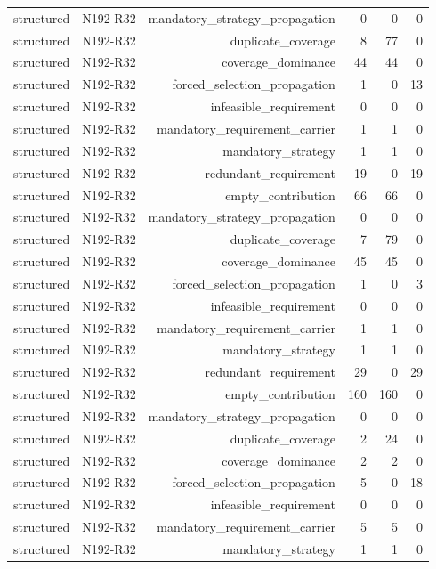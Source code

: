 {\begin{longtable}{lrrrrr}
structured & N192-R32 & mandatory\_strategy\_propagation & 0 & 0 & 0 \\
structured & N192-R32 & duplicate\_coverage & 8 & 77 & 0 \\
structured & N192-R32 & coverage\_dominance & 44 & 44 & 0 \\
structured & N192-R32 & forced\_selection\_propagation & 1 & 0 & 13 \\
structured & N192-R32 & infeasible\_requirement & 0 & 0 & 0 \\
structured & N192-R32 & mandatory\_requirement\_carrier & 1 & 1 & 0 \\
structured & N192-R32 & mandatory\_strategy & 1 & 1 & 0 \\
structured & N192-R32 & redundant\_requirement & 19 & 0 & 19 \\
structured & N192-R32 & empty\_contribution & 66 & 66 & 0 \\
structured & N192-R32 & mandatory\_strategy\_propagation & 0 & 0 & 0 \\
structured & N192-R32 & duplicate\_coverage & 7 & 79 & 0 \\
structured & N192-R32 & coverage\_dominance & 45 & 45 & 0 \\
structured & N192-R32 & forced\_selection\_propagation & 1 & 0 & 3 \\
structured & N192-R32 & infeasible\_requirement & 0 & 0 & 0 \\
structured & N192-R32 & mandatory\_requirement\_carrier & 1 & 1 & 0 \\
structured & N192-R32 & mandatory\_strategy & 1 & 1 & 0 \\
structured & N192-R32 & redundant\_requirement & 29 & 0 & 29 \\
structured & N192-R32 & empty\_contribution & 160 & 160 & 0 \\
structured & N192-R32 & mandatory\_strategy\_propagation & 0 & 0 & 0 \\
structured & N192-R32 & duplicate\_coverage & 2 & 24 & 0 \\
structured & N192-R32 & coverage\_dominance & 2 & 2 & 0 \\
structured & N192-R32 & forced\_selection\_propagation & 5 & 0 & 18 \\
structured & N192-R32 & infeasible\_requirement & 0 & 0 & 0 \\
structured & N192-R32 & mandatory\_requirement\_carrier & 5 & 5 & 0 \\
structured & N192-R32 & mandatory\_strategy & 1 & 1 & 0 \\

\end{longtable}}
